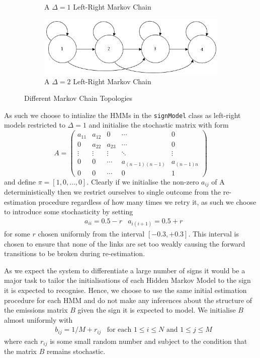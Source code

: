 \begin{figure} [t]
\begin{subfigure}[b]{0.5\textwidth}
                \caption{A $\Delta = 1$ Left-Right Markov Chain}
                \label{fig:clust}
        \end{subfigure}
	   \begin{subfigure}[b]{0.5\textwidth}
                \centering
                \includegraphics[width=1.0\textwidth]{ThesisFigs/del2LRMC}
                \caption{A $\Delta = 2$ Left-Right Markov Chain}
                \label{fig:clust}
        \end{subfigure}
        \caption{Different Markov Chain Topologies}\label{fig:mctop}
\end{figure}

As such we choose to intialize the HMMs in the \verb|signModel| class as left-right models restricted to $\Delta = 1$ and initialise the stochastic matrix with form
\begin{equation*}
A =
 \begin{pmatrix}
  a_{11} & a_{12} & 0 & \cdots & 0 \\
  0 & a_{22} & a_{23} &\cdots & 0 \\
  \vdots  & \vdots  & \vdots & \ddots & \vdots  \\
  0 & 0 & \cdots & a_{(n-1)(n-1)}& a_{(n-1)n} \\
  0 & 0 & \cdots & 0& 1
 \end{pmatrix}
\end{equation*}
and define $\pi = [1,0, \dots, 0]$. Clearly if we initialise the non-zero $a_{ij}$ of A deterministically then we restrict ourselves to single outcome from the re-estimation procedure regardless of how many times we retry it, as such we choose to introduce some stochasticity by setting
\begin{align*}
&a_{ii} = 0.5 - r &a_{i(i+1)} = 0.5 + r
\end{align*}
 for some $r$ chosen uniformly from the interval $[-0.3, +0.3]$. This interval is chosen to ensure that none of the links are set too weakly causing the forward transitions to be broken during re-estimation.

As we expect the system to differentiate a large number of signs it would be a major task to tailor the initialisations of each Hidden Markov Model to the sign it is expected to recognise. Hence, we choose to use the same initial estimation procedure for each HMM and do not make any inferences about the structure of the emissions matrix $B$ given the sign it is expected to model. We initialise $B$ almost uniformly with
\begin{align*}
&b_{ij} = 1/M + r_{ij} &\text{for each $1\leq i \leq N$ and $1 \leq j \leq M$}
\end{align*}
where each $r_{ij}$ is some small random number and subject to the condition that the matrix $B$ remains stochastic.

